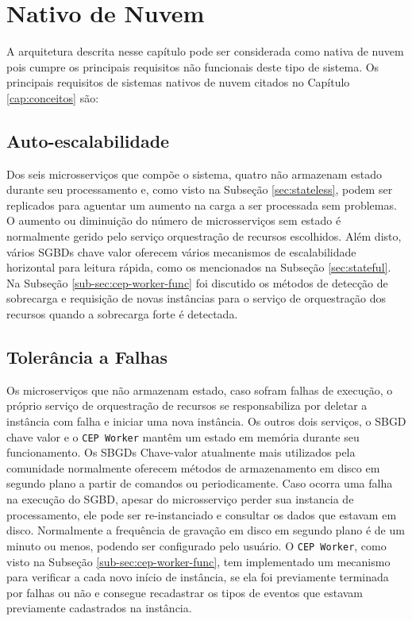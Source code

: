 

\section{Nativo de Nuvem}

A arquitetura descrita nesse capítulo pode ser considerada como nativa de nuvem pois cumpre os principais requisitos não funcionais deste tipo de sistema. Os principais requisitos de sistemas nativos de nuvem citados no Capítulo \ref{cap:conceitos} são: 

\subsection{Auto-escalabilidade}  

Dos seis microsserviços que compõe o sistema, quatro não armazenam estado durante seu processamento e, como visto na Subseção \ref{sec:stateless}, podem ser replicados para aguentar um aumento na carga a ser processada sem problemas. O aumento ou diminuição do número de microsserviços sem estado é normalmente gerido pelo serviço orquestração de recursos escolhidos. Além disto, vários SGBDs chave valor oferecem vários mecanismos de escalabilidade horizontal para leitura rápida, como os mencionados na Subseção \ref{sec:stateful}. Na Subseção \ref{sub-sec:cep-worker-func} foi discutido os métodos de detecção de sobrecarga e requisição de novas instâncias para o serviço de orquestração dos recursos quando a sobrecarga forte é detectada. 

\subsection{Tolerância a Falhas} 

Os microserviços que não armazenam estado, caso sofram falhas de execução, o próprio serviço de orquestração de recursos se responsabiliza por deletar a instância com falha e iniciar uma nova instância. Os outros dois serviços, o SBGD chave valor e o \texttt{CEP Worker} mantêm um estado em memória durante seu funcionamento. Os SBGDs Chave-valor atualmente mais utilizados pela comunidade normalmente oferecem métodos de armazenamento em disco em segundo plano a partir de comandos ou periodicamente. Caso ocorra uma falha na execução do SGBD, apesar do microsserviço perder sua instancia de processamento, ele pode ser re-instanciado e consultar os dados que estavam em disco. Normalmente a frequência de gravação em disco em segundo plano é de um minuto ou menos, podendo ser configurado pelo usuário. O \texttt{CEP Worker}, como visto na Subseção \ref{sub-sec:cep-worker-func}, tem implementado um mecanismo para verificar a cada novo início de instância, se ela foi previamente terminada por falhas ou não e consegue recadastrar os tipos de eventos que estavam previamente cadastrados na instância.

